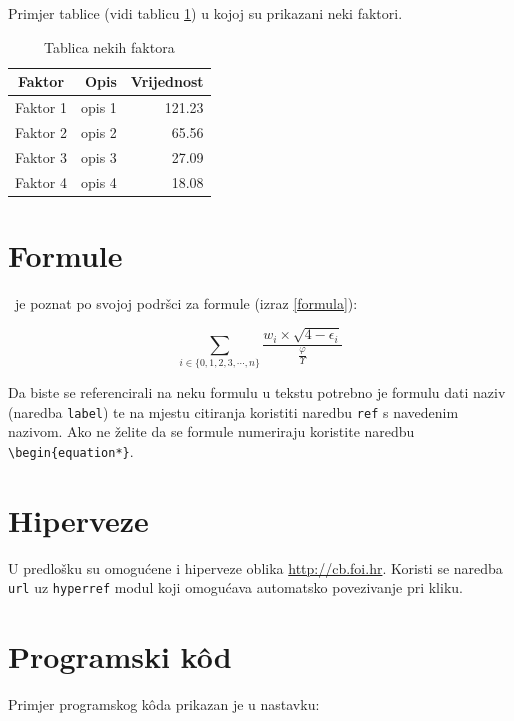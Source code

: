 \documentclass[a4paper,12pt]{foi}
\begin{document}
Primjer tablice (vidi tablicu \ref{tablica-1}) u kojoj su prikazani neki faktori.


\begin{table}[h]
\caption{Tablica nekih faktora}
\begin{center}
\begin{tabular}{||c|r|r||}
\hline
\textbf{Faktor}&\textbf{Opis}&\textbf{Vrijednost} \\
\hline
Faktor 1&opis 1&121.23 \\
Faktor 2&opis 2&65.56 \\
Faktor 3&opis 3&27.09 \\
Faktor 4&opis 4&18.08 \\
\hline
\end{tabular}
\end{center}
\label{tablica-1}
\end{table}

\chapter{Formule}

\LaTeXe\ je poznat po svojoj podr\v{s}ci za formule (izraz \ref{formula}):

\begin{equation}
 \label{formula}
 \displaystyle\sum_{i \in \{ 0, 1, 2, 3, \cdots, n\}}{\frac{w_i \times \sqrt{4 - \epsilon_i}}{\frac{\varphi}{\Upsilon}}}
\end{equation} 

Da biste se referencirali na neku formulu u tekstu potrebno je formulu dati naziv (naredba \texttt{label}) te na mjestu citiranja koristiti naredbu \texttt{ref} s navedenim nazivom. Ako ne želite da se formule numeriraju koristite naredbu \texttt{\textbackslash begin\{equation*\}}.

\chapter{Hiperveze}

U predlo\v{s}ku su omogu\'{c}ene i hiperveze oblika \url{http://cb.foi.hr}. Koristi se naredba \texttt{url} uz \texttt{hyperref} modul koji omogućava automatsko povezivanje pri kliku.

\chapter{Programski k\^{o}d}

Primjer programskog k\^{o}da prikazan je u nastavku:
\end{document}
